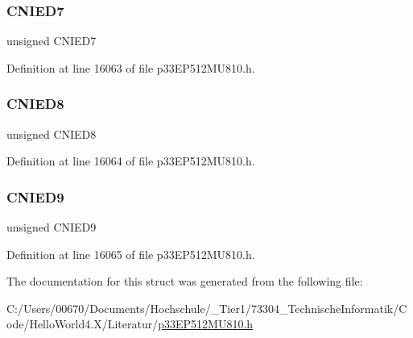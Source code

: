 \subsubsection{\texorpdfstring{C\+N\+I\+E\+D7}{CNIED7}}
{\footnotesize\ttfamily unsigned C\+N\+I\+E\+D7}



Definition at line 16063 of file p33\+E\+P512\+M\+U810.\+h.

\mbox{\label{structtag_c_n_e_n_d_b_i_t_s_a5678fe113a6158d62edafa9e2fc3f202}} 
\subsubsection{\texorpdfstring{C\+N\+I\+E\+D8}{CNIED8}}
{\footnotesize\ttfamily unsigned C\+N\+I\+E\+D8}



Definition at line 16064 of file p33\+E\+P512\+M\+U810.\+h.

\mbox{\label{structtag_c_n_e_n_d_b_i_t_s_a55b6caffaf528ff7859ff5eb88158a99}} 
\subsubsection{\texorpdfstring{C\+N\+I\+E\+D9}{CNIED9}}
{\footnotesize\ttfamily unsigned C\+N\+I\+E\+D9}



Definition at line 16065 of file p33\+E\+P512\+M\+U810.\+h.



The documentation for this struct was generated from the following file\+:\begin{DoxyCompactItemize}
\item 
C\+:/\+Users/00670/\+Documents/\+Hochschule/\+\_\+\+Tier1/73304\+\_\+\+Technische\+Informatik/\+Code/\+Hello\+World4.\+X/\+Literatur/\hyperlink{p33_e_p512_m_u810_8h}{p33\+E\+P512\+M\+U810.\+h}\end{DoxyCompactItemize}
